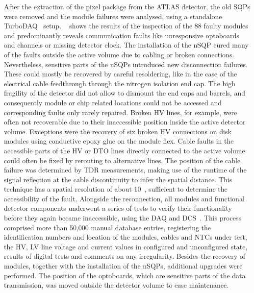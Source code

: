 After the extraction of the pixel package from the \gls{ATLAS} detector, the old \glspl{SQP} were removed and the module failures were ana\-lysed, using a standalone TurboDAQ~\cite{USBPix} setup. 
%
\Fig~ shows the results of the inspection of the 88 faulty modules and predominantly reveals communication faults like unresponsive optoboards and channels or missing detector clock. 
%
The installation of the \gls{nSQP} cured many of the faults outside the active volume due to cabling or broken connections. Nevertheless, sensitive parts of the \glspl{nSQP} introduced new disconnection failures. These could mostly be recovered by careful resoldering, like in the case of the electrical cable feedthrough through the nitrogen isolation end cap. 
%
The high fragility of the detector did not allow to dismount the end caps and barrels, and consequently module or chip related locations could not be accessed and corresponding faults only rarely repaired. Broken \gls{HV} lines, for example, were often not recoverable due to their inaccessible position inside the active detector volume. Exceptions were the recovery of six broken \gls{HV} connections on disk modules using conductive epoxy glue on the module flex. Cable faults in the accessible parts of the \gls{HV} or \gls{DTO} lines directly connected to the active volume could often be fixed by rerouting to alternative lines. The position of the cable failure was determined by \gls{TDR} measurements, making use of the runtime of the signal reflection at the cable discontinuity to infer the spatial distance. This technique has a spatial resolution of about 10~\cm, sufficient to determine the accessibility of the fault. 
%
Alongside the reconnection, all modules and functional detector components underwent a series of tests to verify their functionality before they again became inaccessible, using the \gls{DAQ} and \gls{DCS}~\cite{1748-0221-3-05-P05006}. This process comprised more than 50,000 manual database entries, registering the identification numbers and location of the modules, cables and \glspl{NTC} under test, the \gls{HV}, \gls{LV} line voltage and current values in configured and unconfigured state, results of digital tests and comments on any irregularity. 
%
%
Besides the recovery of modules, together with the installation of the \glspl{nSQP}, additional upgrades were performed. The position of the optoboards, which are sensitive parts of the data transmission, was moved outside the detector volume to ease maintenance. 
